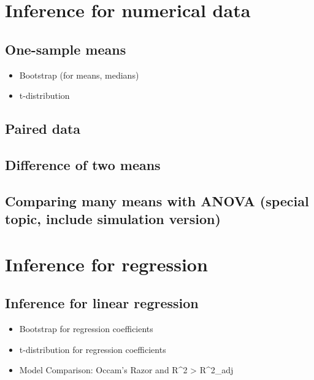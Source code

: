 \documentclass[]{book}
\providecommand{\tightlist}{%
  \setlength{\itemsep}{0pt}\setlength{\parskip}{0pt}}
\begin{document}
\hypertarget{inference-num}{%
\chapter{Inference for numerical data}\label{inference-num}}

\hypertarget{one-sample-means}{%
\section{One-sample means}\label{one-sample-means}}

\begin{itemize}
\tightlist
\item
  Bootstrap (for means, medians)
\item
  t-distribution
\end{itemize}

\hypertarget{paired-data}{%
\section{Paired data}\label{paired-data}}

\hypertarget{difference-of-two-means}{%
\section{Difference of two means}\label{difference-of-two-means}}

\hypertarget{comparing-many-means-with-anova-special-topic-include-simulation-version}{%
\section{Comparing many means with ANOVA (special topic, include simulation version)}\label{comparing-many-means-with-anova-special-topic-include-simulation-version}}

\hypertarget{inference-reg}{%
\chapter{Inference for regression}\label{inference-reg}}

\hypertarget{inference-for-linear-regression}{%
\section{Inference for linear regression}\label{inference-for-linear-regression}}

\begin{itemize}
\tightlist
\item
  Bootstrap for regression coefficients
\item
  t-distribution for regression coefficients
\item
  Model Comparison: Occam's Razor and R\^{}2 \textgreater{} R\^{}2\_adj
\end{itemize}
\end{document}
